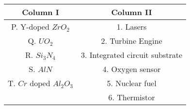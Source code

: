 \begin{tabular}{ |c|c| }
    \hline
    \textbf{Column I} & \textbf{Column II} \\
    \hline
    P. Y-doped $ZrO_2$ & 1. Lasers \\
    \hline 
    Q. $UO_2$ & 2. Turbine Engine \\
    \hline
    R. $Si_{3}N_{4}$ & 3. Integrated circuit substrate \\
    \hline
    S. $AlN$ & 4. Oxygen sensor \\
    \hline
    T. $Cr$ doped $Al_{2}O_{3}$ & 5. Nuclear fuel \\
    \hline
    & 6. Thermistor \\
    \hline
\end{tabular}

